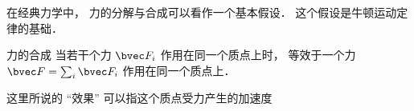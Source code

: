 

在经典力学中， 力的分解与合成可以看作一个基本假设． 这个假设是牛顿运动定律的基础．

\begin{theorem}{力的合成}
当若干个力 $\bvec F_i$ 作用在同一个质点上时， 等效于一个力 $\bvec F = \sum_i \bvec F_i$ 作用在同一个质点上．
\end{theorem}
这里所说的 “效果” 可以指这个质点受力产生的加速度
